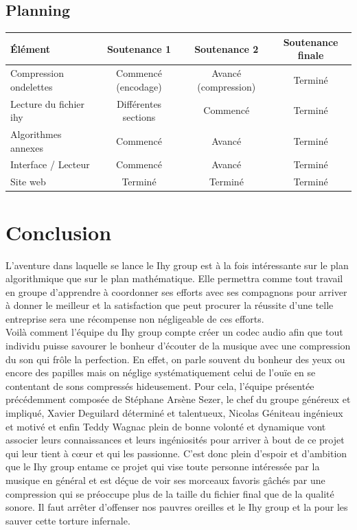 \documentclass[a4paper,12pt]{article}
\begin{document}
\newpage

\begin{landscape}
	\subsection{Planning}
	\begin{center}
	\begin{tabular}{||l||c|c|c||}
		\hline
		\hline
		Élément & Soutenance 1 & Soutenance 2 & Soutenance finale \\
		\hline
		\hline
		Compression   ondelettes   &   Commencé   (encodage)   &  Avancé
		(compression) & Terminé \\
		\hline
		Lecture  du fichier  ihy &  Différentes  sections  &  Commencé &
		Terminé \\
		\hline
		Algorithmes annexes & Commencé & Avanc\'e & Terminé \\
		\hline
		Interface / Lecteur & Commenc\'e & Avancé & Terminé \\
		\hline
		Site web & Terminé & Terminé & Terminé \\
		\hline
		\hline
	\end{tabular}
	\end{center}
\end{landscape}

\newpage

\section*{Conclusion}
L'aventure  dans  laquelle  se  lance  le   Ihy  group  est  à  la  fois
intéressante sur  le plan  algorithmique que  sur le  plan mathématique.
Elle permettra comme tout travail en groupe d'apprendre à coordonner ses
efforts avec  ses compagnons  pour arriver  à donner  le meilleur  et la
satisfaction que peut  procurer la réussite d'une  telle entreprise sera
une récompense non négligeable de ces efforts.\\
Voilà comment l'équipe du Ihy group compte créer un codec audio afin que
tout individu  puisse savourer le  bonheur d'écouter de  la musique avec
une compression  du son  qui frôle  la perfection.  En  effet,  on parle
souvent du bonheur  des  yeux  ou  encore  des  papilles mais on néglige
systématiquement celui  de l'ouïe  en se  contentant de  sons compressés
hideusement.  Pour cela,  l'équipe  présentée  précédemment  composée de
Stéphane Arsène Sezer,  le chef  du groupe généreux et impliqué,  Xavier
Deguilard déterminé et talentueux,  Nicolas Géniteau ingénieux et motivé
et enfin Teddy Wagnac plein de  bonne volonté et dynamique vont associer
leurs  connaissances et  leurs ingéniosités  pour arriver  à bout  de ce
projet qui  leur tient à cœur  et qui  les passionne.  C'est  donc plein
d'espoir et d'ambition que le Ihy  group entame ce projet qui vise toute
personne intéressée par  la musique en général et est  déçue de voir ses
morceaux favoris gâchés par une compression  qui se préoccupe plus de la
taille du fichier  final  que  de  la  qualité  sonore.  Il faut arrêter
d'offenser nos  pauvres oreilles et le  Ihy group et la  pour les sauver
cette torture infernale.
\end{document}
